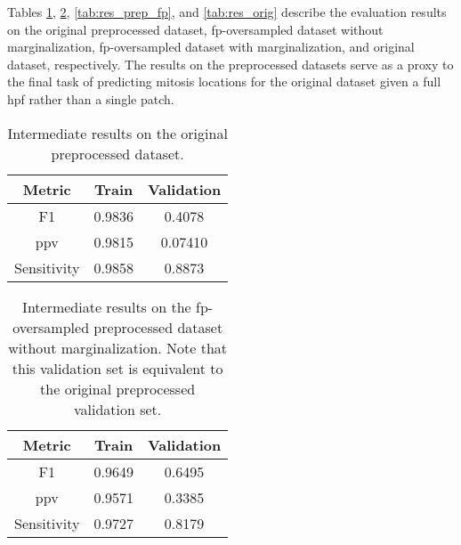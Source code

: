 Tables \ref{tab:res_prep_orig}, \ref{tab:res_prep_fp_nomarg}, \ref{tab:res_prep_fp}, and \ref{tab:res_orig} describe the evaluation results on the original preprocessed dataset, \gls{fp}-oversampled dataset without marginalization, \gls{fp}-oversampled dataset with marginalization, and original dataset, respectively.  The results on the preprocessed datasets serve as a proxy to the final task of predicting mitosis locations for the original dataset given a full \gls{hpf} rather than a single patch.

\begin{table}%
  \centering
  \begin{tabular}{c | c | c}
    Metric & Train & Validation \\
    \hline
    F1 & 0.9836 & 0.4078 \\
    \gls{ppv} & 0.9815 & 0.07410 \\
    Sensitivity & 0.9858 & 0.8873 \\
  \end{tabular}
  \caption{Intermediate results on the original preprocessed dataset.}
  \label{tab:res_prep_orig}
\end{table}

\begin{table}%
  \centering
  \begin{tabular}{c | c | c}
    Metric & Train & Validation \\
    \hline
    F1 & 0.9649 & 0.6495 \\
    \gls{ppv} & 0.9571 & 0.3385 \\
    Sensitivity & 0.9727 & 0.8179 \\
  \end{tabular}
  \caption{Intermediate results on the \gls{fp}-oversampled preprocessed dataset without marginalization.  Note that this validation set is equivalent to the original preprocessed validation set.}
  \label{tab:res_prep_fp_nomarg}
\end{table}

